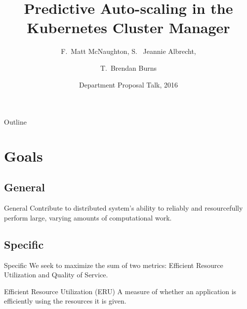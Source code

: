 \documentclass{beamer}
\title{Predictive Auto-scaling in the Kubernetes Cluster Manager}
\author{F.~Matt McNaughton\inst{1}, S. ~Jeannie Albrecht\inst{1}, \and
  T.~Brendan Burns\inst{2}}
\institute[Williams College] %
{
  \inst{1}%
  Department of Computer Science\\
  Williams College
  \and
  \inst{2}%
  Lead Engineer for Kubernetes\\
  Google}
\date{Department Proposal Talk, 2016}
\begin{document}
\begin{frame}
  \titlepage
\end{frame}

\begin{frame}[allowframebreaks]{Outline}
  \tableofcontents
\end{frame}

\section{Goals}

\subsection{General}

\begin{frame}{General}
  Contribute to distributed system's ability to reliably and resourcefully
  perform large, varying amounts of computational work.

\end{frame}

\subsection{Specific}

\begin{frame}{Specific}
  We seek to maximize the sum of two metrics: Efficient Resource Utilization and
  Quality of Service.
\end{frame}

\begin{frame}{Efficient Resource Utilization (ERU)}
  A measure of whether an application is efficiently using the resources it is
  given.


\end{frame}
\end{document}
